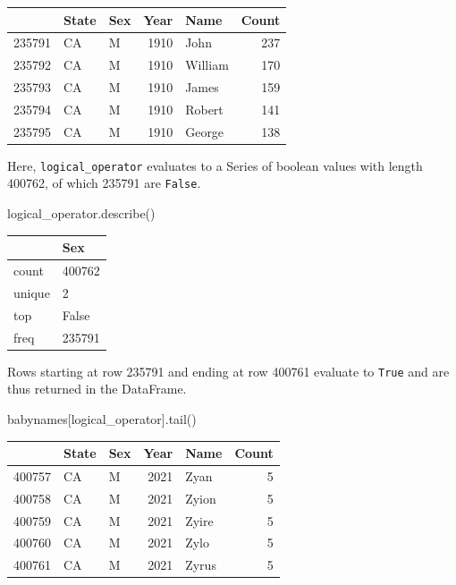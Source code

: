 \documentclass[
  letterpaper,
  DIV=11,
  numbers=noendperiod]{scrreprt}
\newenvironment{Shaded}{\begin{snugshade}}{\end{snugshade}}
\newcommand{\NormalTok}[1]{\textcolor[rgb]{0.00,0.23,0.31}{#1}}
\begin{document}
\begin{tabular}{lllrlr}
\toprule
{} & State & Sex &  Year &     Name &  Count \\
\midrule
235791 &    CA &   M &  1910 &     John &    237 \\
235792 &    CA &   M &  1910 &  William &    170 \\
235793 &    CA &   M &  1910 &    James &    159 \\
235794 &    CA &   M &  1910 &   Robert &    141 \\
235795 &    CA &   M &  1910 &   George &    138 \\
\bottomrule
\end{tabular}

Here, \texttt{logical\_operator} evaluates to a Series of boolean values
with length 400762, of which 235791 are \texttt{False}.

\begin{Shaded}
\begin{Highlighting}[]
\NormalTok{logical\_operator.describe()}
\end{Highlighting}
\end{Shaded}

\begin{tabular}{ll}
\toprule
{} &     Sex \\
\midrule
count  &  400762 \\
unique &       2 \\
top    &   False \\
freq   &  235791 \\
\bottomrule
\end{tabular}

Rows starting at row 235791 and ending at row 400761 evaluate to
\texttt{True} and are thus returned in the DataFrame.

\begin{Shaded}
\begin{Highlighting}[]
\NormalTok{babynames[logical\_operator].tail()}
\end{Highlighting}
\end{Shaded}

\begin{tabular}{lllrlr}
\toprule
{} & State & Sex &  Year &   Name &  Count \\
\midrule
400757 &    CA &   M &  2021 &   Zyan &      5 \\
400758 &    CA &   M &  2021 &  Zyion &      5 \\
400759 &    CA &   M &  2021 &  Zyire &      5 \\
400760 &    CA &   M &  2021 &   Zylo &      5 \\
400761 &    CA &   M &  2021 &  Zyrus &      5 \\
\bottomrule
\end{tabular}
\end{document}
